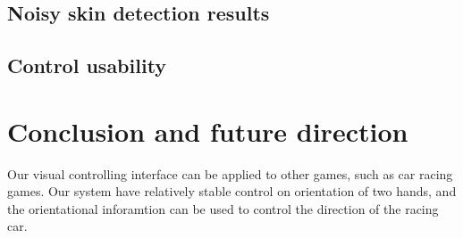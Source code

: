 \documentclass[10pt,twocolumn,letterpaper]{article}
\begin{document}
\subsection{Noisy skin detection results}

\subsection{Control usability}

\section{Conclusion and future direction}
Our visual controlling interface can be applied to other games, 
such as car racing games. Our system have relatively stable control on 
orientation of two hands, and the orientational inforamtion can be 
used to control the direction of the racing car.

{\small


}
\end{document}
